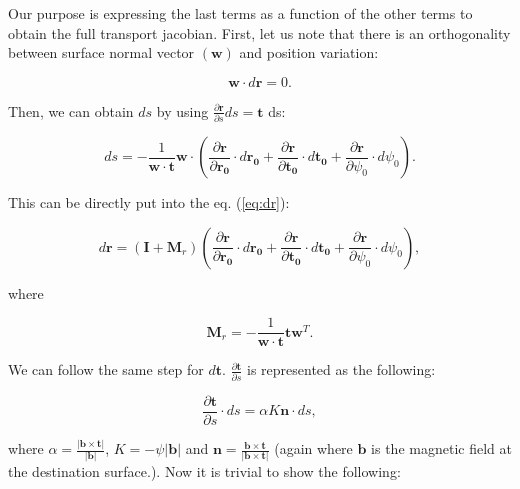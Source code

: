 \documentclass[12pt,a4paper]{scrarticle}
\begin{document}
Our purpose is expressing the last terms as a function of the other terms to obtain the full transport jacobian. First, let us note that there is an orthogonality between surface normal vector $(\mathbf{w})$ and position variation:
 
\begin{equation}
    \mathbf{w} \cdot d\mathbf{r} = 0.
\end{equation}

Then, we can obtain $ds$ by using $\frac{\partial \mathbf{r}}{\partial s} ds = \mathbf{t}$ ds:

\begin{equation}
  ds = - \frac{1}{\mathbf{w} \cdot \mathbf{t}} \mathbf{w} \cdot 
  \left(  
  \frac{\partial \mathbf{r}}{\partial \mathbf{r_0}} \cdot d \mathbf{r_0} +  
  \frac{\partial \mathbf{r}}{\partial \mathbf{t_0}} \cdot d \mathbf{t_0} + 
  \frac{\partial \mathbf{r}}{\partial \psi_0} \cdot d \psi_0 
  \right).
\end{equation}

This can be directly put into the eq. (\ref{eq:dr}):

\begin{equation}\label{eq:dr_final}
    d\mathbf{r} = 
    \left( 
    \mathbf{I} + \mathbf{M}_r 
    \right)   
     \left(  
    \frac{\partial \mathbf{r}}{\partial \mathbf{r_0}} \cdot d \mathbf{r_0} +  
    \frac{\partial \mathbf{r}}{\partial \mathbf{t_0}} \cdot d \mathbf{t_0} + 
    \frac{\partial \mathbf{r}}{\partial \psi_0} \cdot d \psi_0 
    \right),
\end{equation}

where

\begin{equation}
    \mathbf{M}_r = - \frac{1}{\mathbf{w} \cdot \mathbf{t}} \mathbf{t} \mathbf{w}^T.
\end{equation}


We can follow the same step for $d\mathbf{t}$.  $\frac{\partial \mathbf{t}}{\partial s}$ is represented as the following:

\begin{equation}
 \frac{\partial \mathbf{t}}{\partial s} \cdot ds = \alpha K \mathbf{n} \cdot ds,
\end{equation}

where $ \alpha = \frac { | \mathbf{b} \times \mathbf {t} | } { { |\mathbf{b}| } } $, $ K = - \psi |\mathbf{b}| $ and $ \mathbf{n} = \frac {  \mathbf{b} \times \mathbf {t}  } { { |  \mathbf{b} \times \mathbf {t} | } } $ (again where $\mathbf{b}$ is the magnetic field at the destination surface.). Now it is trivial to show the following:
\end{document}
